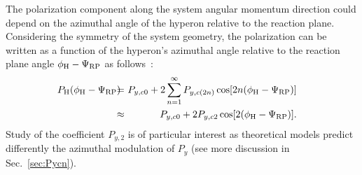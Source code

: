 \documentclass[preprint,5p,times,twocolumn]{elsarticle}
\begin{document}
\label{Pyc2section}

The polarization component along the system angular momentum direction could depend on the azimuthal angle of the hyperon relative to the reaction plane. 
Considering the symmetry of the system geometry, the polarization can be written as a function of the hyperon's azimuthal angle relative to the reaction plane angle $\phi_{\rm H}-\Psi_{\rm RP}$ as follows~\cite{Niida:2024ntm}:
%
\begin{eqnarray}    
\!\!\!\!\!\! P_{\rm H}(\phi_{\rm H}-\Psi_{\rm RP})
    \!\!\!\! &=& \!\!\!\! P_{y,c0}+2\sum_{n=1}^{\infty} P_{y,c(2n)}\cos[2n(\phi_{\rm H}-\Psi_{\rm RP})] \\
    \label{equ:Pyc2}
    \!\!\!\! &\approx& \!\!\!\! P_{y,c0}  + 2P_{y,c2}\cos[2(\phi_{\rm H}-\Psi_{\rm RP})] \label{eq:Pyc0c2}.
\end{eqnarray}
%
Study of the coefficient $P_{y,2}$ is of particular interest as theoretical models predict differently the azimuthal modulation of $P_y$ (see more discussion in Sec.~\ref{sec:Pycn}). 
\end{document}
